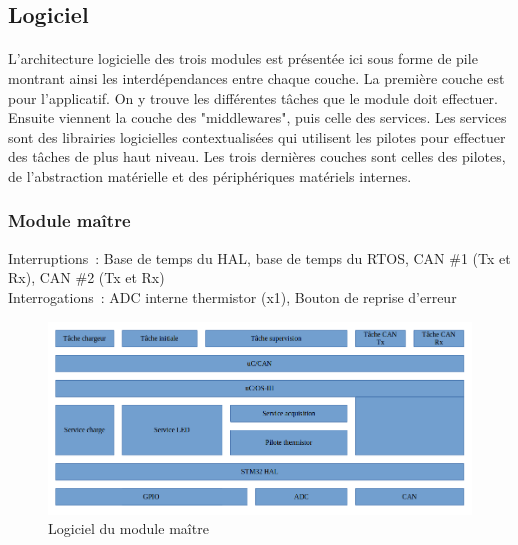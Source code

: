 \subsection{Logiciel}
	\paragraph*{}
	L'architecture logicielle des trois modules est présentée ici sous forme de pile montrant ainsi les interdépendances entre chaque couche. La première couche est pour l'applicatif. On y trouve les différentes tâches que le module doit effectuer. Ensuite viennent la couche des "middlewares", puis celle des services. Les services sont des librairies logicielles contextualisées qui utilisent les pilotes pour effectuer des tâches de plus haut niveau. Les trois dernières couches sont celles des pilotes, de l'abstraction matérielle et des périphériques matériels internes.
	\subsubsection*{Module maître}
		\noindent
		Interruptions : Base de temps du HAL, base de temps du RTOS, CAN \#1 (Tx et Rx),  CAN \#2 (Tx et Rx) \\
		Interrogations : ADC interne thermistor (x1), Bouton de reprise d’erreur
		\begin{figure}[H]
			\centering
			\includegraphics[scale=0.5]{Images/Logiciel_Master.png}
			\caption{Logiciel du module maître}
			\label{fig:logiciel_master}
		\end{figure}
